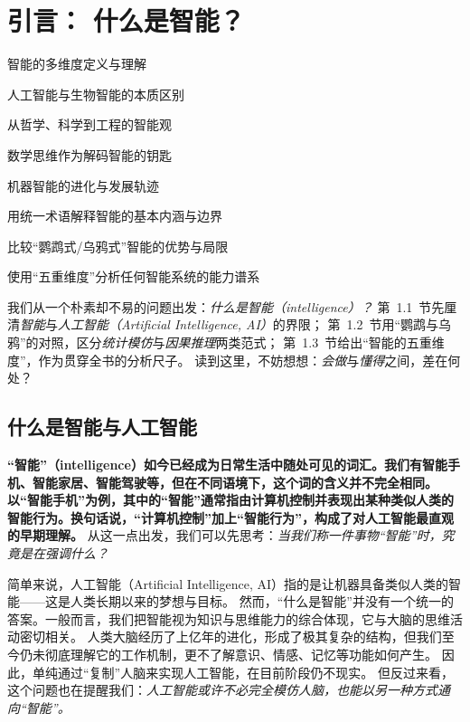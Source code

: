 \chapter{ 引言：  什么是智能？}
 \begin{introduction}
  \item 智能的多维度定义与理解
  \item 人工智能与生物智能的本质区别
  \item 从哲学、科学到工程的智能观
  \item 数学思维作为解码智能的钥匙
  \item 机器智能的进化与发展轨迹
\end{introduction}

\begin{introduction}
  \item 用统一术语解释智能的基本内涵与边界
  \item 比较“鹦鹉式/乌鸦式”智能的优势与局限
  \item 使用“五重维度”分析任何智能系统的能力谱系
\end{introduction}

我们从一个朴素却不易的问题出发：\emph{什么是智能（intelligence）？}
第~1.1~节先厘清\emph{智能}与\emph{人工智能（Artificial Intelligence, AI）}的界限；
第~1.2~节用“鹦鹉与乌鸦”的对照，区分\emph{统计模仿}与\emph{因果推理}两类范式；
第~1.3~节给出“智能的五重维度”，作为贯穿全书的分析尺子。
读到这里，不妨想想：\emph{会做}与\emph{懂得}之间，差在何处？

\section{什么是智能与人工智能}\textbf{\label{sec:what-is-intelligence}}

\textbf{“智能”（intelligence）如今已经成为日常生活中随处可见的词汇。我们有智能手机、智能家居、智能驾驶等，但在不同语境下，这个词的含义并不完全相同。以“智能手机”为例，其中的“智能”通常指由计算机控制并表现出某种类似人类的智能行为。换句话说，“计算机控制”加上“智能行为”，构成了对人工智能最直观的早期理解。}
从这一点出发，我们可以先思考：\emph{当我们称一件事物“智能”时，究竟是在强调什么？}

简单来说，人工智能（Artificial Intelligence, AI）指的是让机器具备类似人类的智能——这是人类长期以来的梦想与目标。
然而，“什么是智能”并没有一个统一的答案。一般而言，我们把智能视为知识与思维能力的综合体现，它与大脑的思维活动密切相关。
人类大脑经历了上亿年的进化，形成了极其复杂的结构，但我们至今仍未彻底理解它的工作机制，更不了解意识、情感、记忆等功能如何产生。
因此，单纯通过“复制”人脑来实现人工智能，在目前阶段仍不现实。
但反过来看，这个问题也在提醒我们：\emph{人工智能或许不必完全模仿人脑，也能以另一种方式通向“智能”。}

